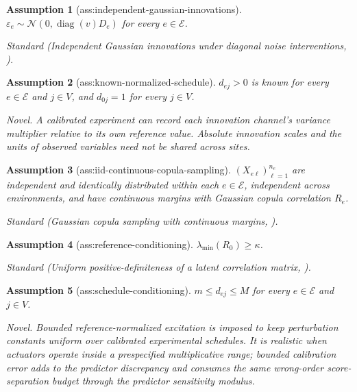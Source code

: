 \documentclass{article}
\newtheorem{assumption}{Assumption}
\begin{document}
\begin{assumption}[ass:independent-gaussian-innovations]\label{ass:independent-gaussian-innovations}
\(\varepsilon_e\sim\mathcal N(0,\operatorname{diag}(v)D_e)\) for every \(e\in\mathcal E\).
\par\smallskip\noindent\emph{Standard} (Independent Gaussian innovations under diagonal noise interventions, \cite{GamellaEtAl2022GnIES}).
\end{assumption}

\begin{assumption}[ass:known-normalized-schedule]\label{ass:known-normalized-schedule}
\(d_{ej}>0\) is known for every \(e\in\mathcal E\) and \(j\in V\), and \(d_{0j}=1\) for every \(j\in V\).
\par\smallskip\noindent\emph{Novel.} A calibrated experiment can record each innovation channel's variance multiplier relative to its own reference value. Absolute innovation scales and the units of observed variables need not be shared across sites.
\end{assumption}

\begin{assumption}[ass:iid-continuous-copula-sampling]\label{ass:iid-continuous-copula-sampling}
\((X_{e\ell})_{\ell=1}^{n_e}\) are independent and identically distributed within each \(e\in\mathcal E\), independent across environments, and have continuous margins with Gaussian copula correlation \(R_e\).
\par\smallskip\noindent\emph{Standard} (Gaussian copula sampling with continuous margins, \cite{LiuEtAl2012NPNskeptic}).
\end{assumption}

\begin{assumption}[ass:reference-conditioning]\label{ass:reference-conditioning}
\(\lambda_{\min}(R_0)\ge\kappa\).
\par\smallskip\noindent\emph{Standard} (Uniform positive-definiteness of a latent correlation matrix, \cite{MitraZhang2014RankCorrelation}).
\end{assumption}

\begin{assumption}[ass:schedule-conditioning]\label{ass:schedule-conditioning}
\(m\le d_{ej}\le M\) for every \(e\in\mathcal E\) and \(j\in V\).
\par\smallskip\noindent\emph{Novel.} Bounded reference-normalized excitation is imposed to keep perturbation constants uniform over calibrated experimental schedules. It is realistic when actuators operate inside a prespecified multiplicative range; bounded calibration error adds to the predictor discrepancy and consumes the same wrong-order score-separation budget through the predictor sensitivity modulus.
\end{assumption}
\end{document}
